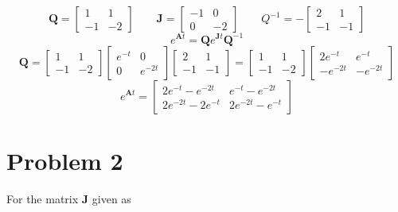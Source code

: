 \documentclass{article}
\begin{document}
\begin{enumerate}[1.]
$$$$
$$
\mathbf{Q}=\begin{bmatrix} 1 & 1 \\ -1  & -2 \end{bmatrix}
\qquad
\mathbf{J}
=
\begin{bmatrix}
-1 & 0 \\
0 & -2
\end{bmatrix}
\qquad
Q^{-1}
= -
\begin{bmatrix}
2 & 1\\
-1 & -1
\end{bmatrix}
$$
$$
e^{\mathbf{A}t}
=\mathbf{Q} e^{\mathbf{J}t} \mathbf{Q}^{-1}
$$
$$
\mathbf{Q}=
\begin{bmatrix}
1 & 1 \\
-1  & -2
\end{bmatrix}
\begin{bmatrix}
e^{-t} & 0 \\
0 & e^{-2t}
\end{bmatrix}
\begin{bmatrix}
2 & 1\\
-1 & -1
\end{bmatrix}
=
\begin{bmatrix}
1 & 1 \\
-1  & -2
\end{bmatrix}
\begin{bmatrix}
2e^{-t} & e^{-t} \\
-e^{-2t} & -e^{-2t}
\end{bmatrix}
$$
$$
e^{\mathbf{A}t}
=
\begin{bmatrix}
2e^{-t}-e^{-2t}  & e^{-t}-e^{-2t} \\
2e^{-2t}-2e^{-t} & 2e^{-2t}-e^{-t}
\end{bmatrix}
$$

\end{enumerate}

\section*{Problem 2}
For the matrix $\mathbf{J}$ given as
\end{document}
